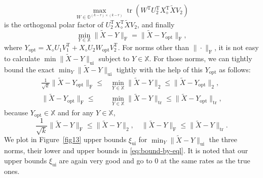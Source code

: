 \documentclass[11pt]{article}
\def\bbO{\mathbb{O}}
\def\bbX{\mathbb{X}}
\def\cX{{\cal X}}
\def\sss{\scriptscriptstyle}
\DeclareMathOperator*{\opt}{opt}
\DeclareMathOperator{\tr}{tr}
\DeclareMathOperator{\F}{F}
\DeclareMathOperator{\T}{T}
\DeclareMathOperator{\UI}{ui}
\def\wtd{\widetilde}
\theoremstyle{definition}
\numberwithin{equation}{section}
\numberwithin{figure}{section}
\numberwithin{table}{section}
\begin{document}
\[
\max_{W\in\bbO^{(k-r)\times(k-r)}}\tr(W^{\T}U_2^{\T}X_{\sss\diamond}^{\T}\wtd XV_2)
\]
is the orthogonal polar factor of $U_2^{\T}X_{\sss\diamond}^{\T}\wtd XV_2$, and finally
\begin{equation}\label{eq:opt-form}
\min_{Y\in\bbX}\|\wtd X-Y\|_{\F}=\|\wtd X-Y_{\opt}\|_{\F},
\end{equation}
where $Y_{\opt}=X_{\sss\diamond}U_1V_1^{\T}+X_{\sss\diamond}U_2W_{\opt}V_2^{\T}$.
For norms other than $\|\cdot\|_{\F}$, it is not easy to calculate $\min\|\wtd X-Y\|_{\UI}$ subject to $Y\in\bbX$. For those norms,
we can tightly bound the exact $\min_Y\|\wtd X-Y\|_{\UI}$ tightly with the help of this $Y_{\opt}$ as follows:
\begin{subequations} \label{eq:bound-by-eql}
    \begin{align}
\frac 1{\sqrt k}\|\wtd X-Y_{\opt}\|_{\F}\le&\min_{Y\in\bbX}\|\wtd X-Y\|_2\le\|\wtd X-Y_{\opt}\|_2, %
        \label{eq:bound-by-eql-2} \\
\|\wtd X-Y_{\opt}\|_{\F}\le&\min_{Y\in\bbX}\|\wtd X-Y\|_{\tr}\le\|\wtd X-Y_{\opt}\|_{\tr}, %
        \label{eq:bound-by-eql-ncl}
    \end{align}
\end{subequations}
because $Y_{\opt}\in\bbX$ and for any $Y\in\bbX$,
$$
\frac 1{\sqrt k}\|\wtd X-Y\|_{\F}\le\|\wtd X-Y\|_2, \quad
\|\wtd X-Y\|_{\F}\le\|\wtd X-Y\|_{\tr}.
$$
We plot in Figure~\ref{fig13} upper bounds $\xi_{\UI}$ for $\min_Y\|\wtd X-Y\|_{\UI}$ the three norms,
their lower and upper bounds in \eqref{eq:bound-by-eql}.
It is noted  that
our upper bounds $\xi_{\UI}$ are again very good and go to $0$ at the same rates as the true ones.
\end{document}
